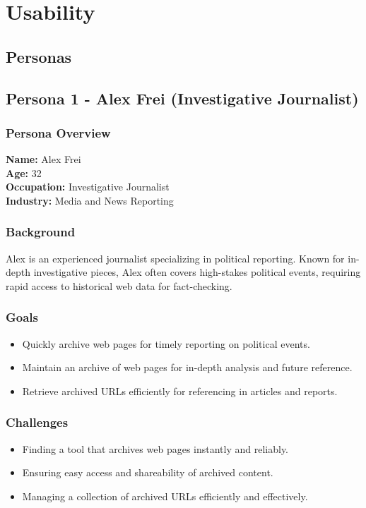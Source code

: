 \section{Usability}

\subsection{Personas}

\subsection{Persona 1 - Alex Frei (Investigative Journalist)}

\subsubsection{Persona Overview}

\textbf{Name:} Alex Frei \\
\textbf{Age:} 32 \\
\textbf{Occupation:} Investigative Journalist \\
\textbf{Industry:} Media and News Reporting

\subsubsection{Background}
Alex is an experienced journalist specializing in political reporting.
Known for in-depth investigative pieces, Alex often covers high-stakes political events, requiring rapid access to historical web data for fact-checking.

\subsubsection{Goals}
\begin{itemize}
    \item Quickly archive web pages for timely reporting on political events.
    \item Maintain an archive of web pages for in-depth analysis and future reference.
    \item Retrieve archived URLs efficiently for referencing in articles and reports.
\end{itemize}

\subsubsection{Challenges}
\begin{itemize}
    \item Finding a tool that archives web pages instantly and reliably.
    \item Ensuring easy access and shareability of archived content.
    \item Managing a collection of archived URLs efficiently and effectively.
\end{itemize}

